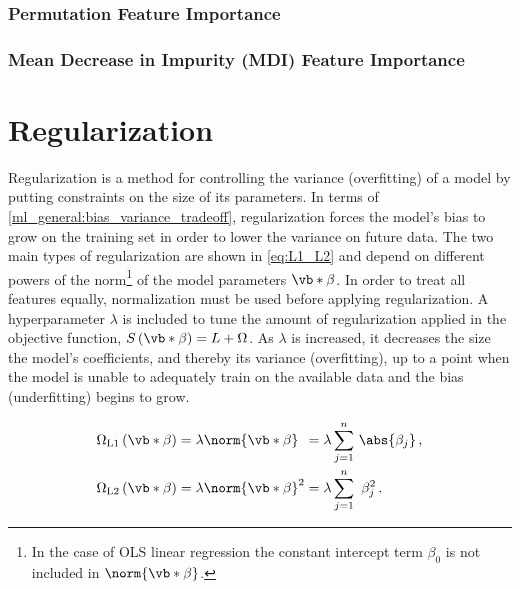 \subsubsection{Permutation Feature Importance}
\label{ml_general:interp:feature_importance:permutation}

\subsubsection{Mean Decrease in Impurity (MDI) Feature Importance}
\label{ml_general:interp:feature_importance:MDI}

\section{Regularization}
\label{ml_general:reg}

Regularization is a method for controlling the variance (overfitting)
of a model by putting constraints on the size of its parameters.
In terms of \cref{ml_general:bias_variance_tradeoff}, regularization forces the model's
bias to grow on the training set in order to lower the variance on future data.
The two main types of regularization are shown in \cref{eq:L1_L2}
and depend on different powers of the norm\footnote{In
the case of OLS linear regression the constant intercept term $\beta_{0}$ is not included in $\norm{\vb*{\beta}}$.} of the model parameters $\vb*{\beta}$.
In order to treat all features equally, normalization must be used before applying regularization.
A hyperparameter $\lambda$ is included to tune the amount of regularization applied in the objective function,
$S\left(\vb*{\beta}\right) = L + \Omega$.
As $\lambda$ is increased, it decreases the size the model's coefficients, and thereby its variance (overfitting),
up to a point when the model is unable to adequately train on the available data and the bias (underfitting) begins to grow.

\begin{subequations} \label{eq:L1_L2}
\begin{align}
\Omega_{\text{L1}}\left(\vb*{\beta}\right) &= \lambda \norm{\vb*{\beta}}\hphantom{^{1}}
= \lambda \sum_{j=1}^{n} \, \abs{\beta_{j}}\,, \label{eq:L1} \\
\Omega_{\text{L2}}\left(\vb*{\beta}\right) &= \lambda \norm{\vb*{\beta}}^{2}
= \lambda \sum_{j=1}^{n} \,\, \beta_{j}^{2}\,. \label{eq:L2}
\end{align}
\end{subequations}

